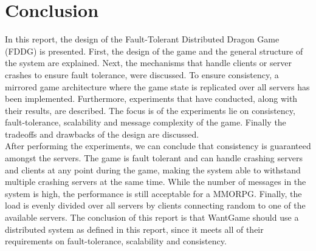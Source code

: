 \section{Conclusion}
In this report, the design of the Fault-Tolerant Distributed Dragon Game (FDDG) is presented. First, the design of the game and the general structure of the system are explained. Next, the mechanisms that handle clients or server crashes to ensure fault tolerance, were discussed. To ensure consistency, a mirrored game architecture where the game state is replicated over all servers has been implemented. Furthermore, experiments that have conducted, along with their results, are described. The focus is of the experiments lie on consistency, fault-tolerance, scalability and message complexity of the game. Finally the tradeoffs and drawbacks of the design are discussed.\\
After performing the experiments, we can conclude that consistency is guaranteed amongst the servers. The game is fault tolerant and can handle crashing servers and clients at any point during the game, making the system able to withstand multiple crashing servers at the same time. While the number of messages in the system is high, the performance is still acceptable for a MMORPG. Finally, the load is evenly divided over all servers by clients connecting random to one of the available servers.
The conclusion of this report is that WantGame should use a distributed system as defined in this report, since it meets all of their requirements on fault-tolerance, scalability and consistency.